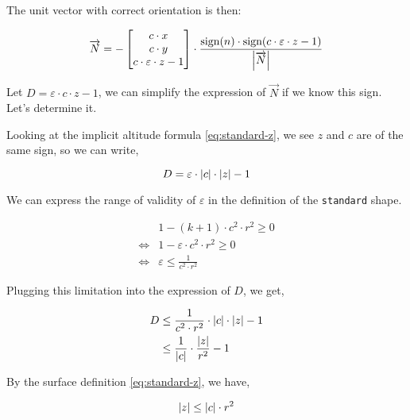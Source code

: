 The unit vector with correct orientation is then:

\begin{equation}
\overrightarrow{N} = -
\begin{bmatrix}
c \cdot x \\ c \cdot y \\ c \cdot \varepsilon \cdot z - 1
\end{bmatrix} \cdot
\frac{\textrm{sign}(n) \cdot \textrm{sign}(c \cdot \varepsilon \cdot z - 1)}
{\abs{\overrightarrow{N}}}
\end{equation}

Let $D = \varepsilon \cdot c \cdot z - 1$, we can simplify the expression
of $\overrightarrow{N}$ if we know this sign. Let's determine it.

Looking at the implicit altitude formula \cref{eq:standard-z}, we see
$z$ and $c$ are of the same sign, so we can write,

\begin{equation}
D = \varepsilon \cdot \abs{c} \cdot \abs{z} - 1
\end{equation}

We can express the range of validity of $\varepsilon$ in the definition
of the \lstinline{standard} shape.

\begin{equation} \begin{split}
& 1 - (k+1) \cdot c^2 \cdot r^2 \geq 0 \\
\iff & 1 - \varepsilon \cdot c^2 \cdot r^2 \geq 0 \\
\iff & \varepsilon \leq \frac{1}{c^2 \cdot r^2}
\end{split} \end{equation}

Plugging this limitation into the expression of $D$, we get,

\begin{equation} \begin{split}
D &\leq \frac{1}{c^2 \cdot r^2} \cdot \abs{c} \cdot \abs{z} - 1 \\
  &\leq \frac{1}{\abs{c}} \cdot \frac{\abs{z}}{r^2} - 1
\end{split} \end{equation}

By the surface definition \cref{eq:standard-z}, we have,

\begin{equation}
\abs{z} \leq \abs{c} \cdot r^2
\end{equation}

